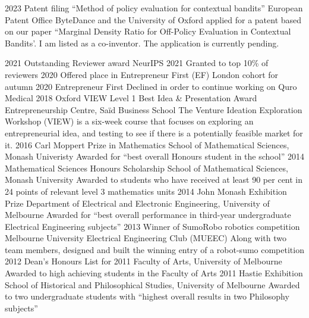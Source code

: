 \documentclass[9pt]{developercv} %
\begin{document}
\vspace{-1em}


\begin{entrylist}
  \entry
    {2023}
    {Patent filing ``Method of policy evaluation for contextual bandits''}
    {European Patent Office}
    {ByteDance and the University of Oxford applied for a patent based on our paper ``Marginal Density Ratio for Off-Policy Evaluation in Contextual Bandits'. I am listed as a co-inventor. The application is currently pending.}

  \entry
    {2021}
    {Outstanding Reviewer award}
    {NeurIPS 2021}
    {Granted to top 10\% of reviewers}
  \entry
    {2020}
    {Offered place in Entrepreneur First (EF) London cohort for autumn 2020}
    {Entrepreneur First}
    {Declined in order to continue working on Quro Medical}
  \entry
    {2018}
    {Oxford VIEW Level 1 Best Idea \& Presentation Award}
    {Entrepreneurship Centre, Sa\"id Business School}
    {The Venture Ideation Exploration Workshop (VIEW) is a six-week course that focuses on exploring an entrepreneurial idea, and testing to see if there is a potentially feasible market for it.}
  \entry
    {2016}
    {Carl Moppert Prize in Mathematics}
    {School of Mathematical Sciences, Monash Univeristy}
    {Awarded for ``best overall Honours student in the school''}
  \entry
    {2014}
    {Mathematical Sciences Honours Scholarship}
    {School of Mathematical Sciences, Monash University}
    {Awarded to students who have received at least 90 per cent in 24 points of relevant level 3 mathematics units}
  \entry
    {2014}
    {John Monash Exhibition Prize}
    {Department of Electrical and Electronic Engineering, University of Melbourne}
    {Awarded for ``best overall performance in third-year undergraduate Electrical Engineering subjects''}
  \entry
    {2013}
    {Winner of SumoRobo robotics competition}
    {Melbourne University Electrical Engineering Club (MUEEC)}
    {Along with two team members, designed and built the winning entry of a robot-sumo competition}
  \entry
    {2012}
    {Dean's Honours List for 2011}
    {Faculty of Arts, University of Melbourne}
    {Awarded to high achieving students in the Faculty of Arts}
  \entry
    {2011}
    {Hastie Exhibition}
    {School of Historical and Philosophical Studies, University of Melbourne}
    {Awarded to two undergraduate students with ``highest overall results in two Philosophy subjects''}
\end{entrylist}
\end{document}
